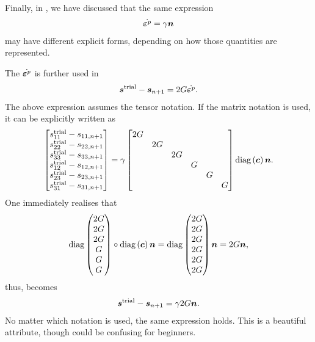 Finally, in , we have discussed that the same expression
\begin{gather}
\dot{\bm{\varepsilon}^p}=\gamma\bm{n}
\end{gather}
may have different explicit forms, depending on how those quantities are represented.

The $\dot{\bm{\varepsilon}^p}$ is further used in
\begin{gather}\label{eq:j2_two_form}
\bm{s}^\text{trial}-\bm{s}_{n+1}=2G\dot{\bm{\varepsilon}^p}.
\end{gather}
The above expression assumes the tensor notation.
If the matrix notation is used, it can be explicitly written as
\begin{gather}
\begin{bmatrix}
s^\text{trial}_{11}-s_{11,n+1}\\
s^\text{trial}_{22}-s_{22,n+1}\\
s^\text{trial}_{33}-s_{33,n+1}\\
s^\text{trial}_{12}-s_{12,n+1}\\
s^\text{trial}_{23}-s_{23,n+1}\\
s^\text{trial}_{31}-s_{31,n+1}
\end{bmatrix}=\gamma\begin{bmatrix}
2G&&&&&\\
&2G&&&&\\
&&2G&&&\\
&&&G&&\\
&&&&G&\\
&&&&&G
\end{bmatrix}\text{diag}\left(\bm{c}\right)\bm{n}.
\end{gather}
One immediately realises that
\begin{gather}
\text{diag}\left(\begin{matrix}
2G\\2G\\2G\\G\\G\\G
\end{matrix}\right)\circ\text{diag}\left(\bm{c}\right)\bm{n}=\text{diag}\left(\begin{matrix}
2G\\2G\\2G\\2G\\2G\\2G
\end{matrix}\right)\bm{n}=2G\bm{n},
\end{gather}
thus,  becomes
\begin{gather}
\bm{s}^\text{trial}-\bm{s}_{n+1}=\gamma2G\bm{n}.
\end{gather}
No matter which notation is used, the same expression holds.
This is a beautiful attribute, though could be confusing for beginners.
